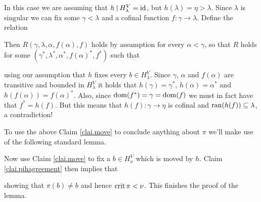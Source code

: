 \documentclass[../../main]{subfiles}
\begin{document}
{{    

    \qquad In this case we are assuming that $h\operatorname{\upharpoonright} H_\lambda^V = \operatorname{id}$, but $h(\lambda) = \eta > \lambda$. Since $\lambda$ is singular we can fix some $\gamma<\lambda$ and a cofinal function $f\colon\gamma\to\lambda$. Define the relation

    Then $R(\gamma,\lambda,\alpha,f(\alpha),f)$ holds by assumption for every $\alpha<\gamma$, so that $R$ holds for some $(\gamma^*,\lambda^*,\alpha^*,f(\alpha)^*,f^*)$ such that

     using our assumption that $h$ fixes every $b\in H_\lambda^V$. Since $\gamma$, $\alpha$ and $f(\alpha)$ are transitive and bounded in $H_\lambda^V$ it holds that $h(\gamma)=\gamma^*$, $h(\alpha)=\alpha^*$ and $h(f(\alpha))=f(\alpha)^*$. Also, since $\operatorname{dom}(f^*)=\gamma=\operatorname{dom}(f)$ we must in fact have that $f^*=h(f)$. But this means that $h(f)\colon\gamma\to\eta$ is cofinal and $\operatorname{ran}(h(f))\subseteq\lambda$, a contradiction!
  }
  
  To use the above Claim \ref{clai.move} to conclude anything about $\pi$ we'll make use of the following standard lemma.



  Now use Claim \ref{clai.move} to fix a $b\in H_\nu^V$ which is moved by $h$. Claim \ref{clai.pihagreement} then implies that

  showing that $\pi(b)\neq b$ and hence $\operatorname{crit}\pi<\nu$. This finishes the proof of the lemma.
}
\end{document}

